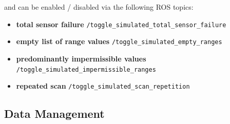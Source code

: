 \documentclass[english, master, utf8]{base/thesis_KBS}
\newcommand{\code}[1]{\colorbox{light-gray}{\texttt{#1}}}
\begin{document}
and can be enabled / disabled via the following ROS topics:
\begin{itemize}
    \item \textbf{total sensor failure} \textrightarrow \code{/toggle\_simulated\_total\_sensor\_failure}
    \item \textbf{empty list of range values} \textrightarrow \code{/toggle\_simulated\_empty\_ranges}
    \item \textbf{predominantly impermissible values} \textrightarrow \code{/toggle\_simulated\_impermissible\_ranges}
    \item \textbf{repeated scan} \textrightarrow \code{/toggle\_simulated\_scan\_repetition}\newline
\end{itemize}

\subsection{Data Management}
\label{sec:sim_and_mon_data_management}
\end{document}
